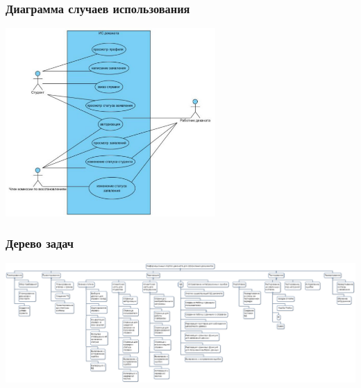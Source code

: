 \documentclass{../../slides-style}
\begin{document}
    \begin{frame}
        \frametitle{Диаграмма случаев использования}
        \begin{center}
            \includegraphics[width=0.6\textwidth]{useCase.png}
        \end{center}
    \end{frame}

    \begin{frame}
        \frametitle{Дерево задач}
        \begin{center}
            \includegraphics[width=\textwidth]{wbs.png}
        \end{center}
    \end{frame}
\end{document}
